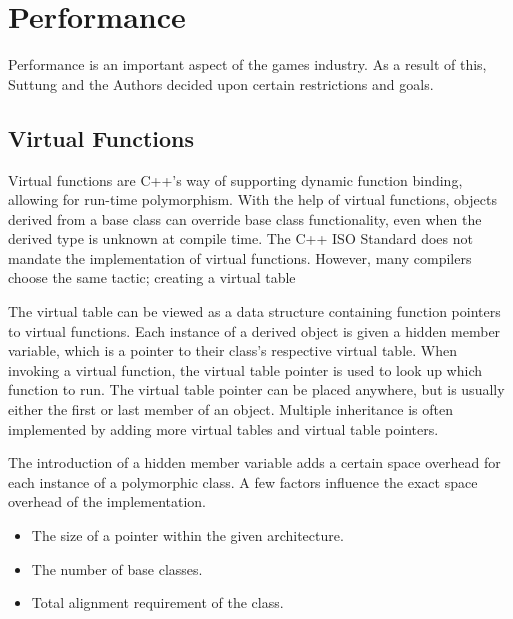 
\section{Performance}
Performance is an important aspect of the games industry.
As a result of this, Suttung and the Authors decided upon certain restrictions and goals.

\subsection{Virtual Functions}
\label{subsec:requirements_performance_virtual_functions}
Virtual functions are C++'s way of supporting dynamic function binding, allowing for run-time polymorphism.
With the help of virtual functions, objects derived from a base class can override base class functionality, even when the derived type is unknown at compile time.
The C++ ISO Standard does not mandate the implementation of virtual functions.
However, many compilers choose the same tactic; creating a virtual table\cite[p. 140]{game_engine_architecture}

The virtual table can be viewed as a data structure containing function pointers to virtual functions.
Each instance of a derived object is given a hidden member variable, which is a pointer to their class's respective virtual table.
When invoking a virtual function, the virtual table pointer is used to look up which function to run.
The virtual table pointer can be placed anywhere, but is usually either the first or last member of an object.
Multiple inheritance is often implemented by adding more virtual tables and virtual table pointers\cite{codersource_virtual_functions}\cite[31:12]{andrei_alexandrescu_quick_code_quickly}.

The introduction of a hidden member variable adds a certain space overhead for each instance of a polymorphic class.
A few factors influence the exact space overhead of the implementation.
\begin{itemize}
    \item
    The size of a pointer within the given architecture.

    \item
    The number of base classes.

    \item
    Total alignment requirement of the class.
\end{itemize}

